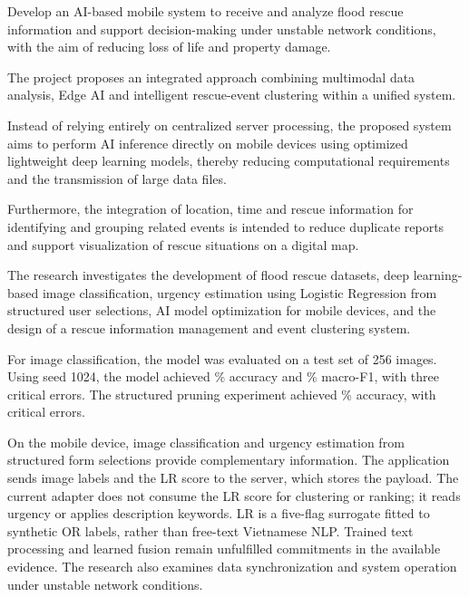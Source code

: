 
Develop an AI-based mobile system to receive and analyze flood rescue information and support decision-making under unstable network conditions, with the aim of reducing loss of life and property damage.

The project proposes an integrated approach combining multimodal data analysis, Edge AI and intelligent rescue-event clustering within a unified system.

Instead of relying entirely on centralized server processing, the proposed system aims to perform AI inference directly on mobile devices using optimized lightweight deep learning models, thereby reducing computational requirements and the transmission of large data files.

Furthermore, the integration of location, time and rescue information for identifying and grouping related events is intended to reduce duplicate reports and support visualization of rescue situations on a digital map.

The research investigates the development of flood rescue datasets, deep learning-based image classification, urgency estimation using Logistic Regression from structured user selections, AI model optimization for mobile devices, and the design of a rescue information management and event clustering system.

For image classification, the model was evaluated on a test set of 256 images. Using seed 1024, the model achieved \NewImageAccuracy\% accuracy and \NewImageMacroFOne\% macro-F1, with three critical errors. The structured pruning experiment achieved \PruningAccuracy\% accuracy, with \PruningCriticalCount{} critical errors.

On the mobile device, image classification and urgency estimation from structured form selections provide complementary information. The application sends image labels and the LR score to the server, which stores the payload. The current adapter does not consume the LR score for clustering or ranking; it reads urgency or applies description keywords. LR is a five-flag surrogate fitted to synthetic OR labels, rather than free-text Vietnamese NLP. Trained text processing and learned fusion remain unfulfilled commitments in the available evidence. The research also examines data synchronization and system operation under unstable network conditions.

